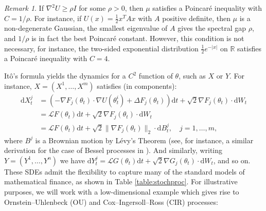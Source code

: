 \documentclass[11pt]{article}
\theoremstyle{plain}
\theoremstyle{definition}
\theoremstyle{remark}
\newtheorem{remark}[theorem]{Remark}
\numberwithin{equation}{section}
\newcommand{\R}{\mathbb{R}}
\renewcommand{\L}{\mathscr{L}}
\renewcommand{\d}{\mathrm{d}}
\newcommand{\lb}{\left}
\newcommand{\rb}{\right}
\begin{document}
\begin{remark}
If $\nabla^2 U\ge \rho I$ for some $\rho>0$, then $\mu$ satisfies a Poincar\'{e} inequality with $C= 1/\rho$. For instance, if $U(x)=\frac{1}{2}x^T Ax$ with $A$ positive definite, then $\mu$ is a non-degenerate Gaussian, the smallest eigenvalue of $A$ gives the spectral gap $\rho$, and $1/\rho$ is in fact the best Poincar\'{e} constant. However, this condition is not necessary, for instance, the two-sided exponential distribution $\frac{1}{2} e^{-|x|}$ on $\R$ satisfies a Poincar\'{e} inequality with $C=4$.
\end{remark}

It\^{o}'s formula yields the dynamics for a $C^2$ function of $\theta$, such as $X$ or $Y$. For instance, ${X=(X^1,\dots,X^m)}$ satisfies (in components):
\begin{equation}\label{eq:XSDE}
\begin{split}
\d X_t^j&=\lb(-\nabla F_j(\theta_t)\cdot \nabla U(\theta_t^i)+\Delta F_{j}(\theta_t)\rb)\d t+\sqrt{2}\nabla F_j(\theta_t) \cdot \d W_t \\
&= \L F(\theta_t) \d t+\sqrt{2}\nabla F_j(\theta_t) \cdot \d W_t\\
&=\L F(\theta_t) \d t+\sqrt{2}\|\nabla F_j(\theta_t)\|_2 \cdot \d B_t^j,\quad j=1,\dots, m,
\end{split}
\end{equation}
where $B^j$ is a Brownian motion by L\'{e}vy's Theorem (see, for instance, a similar derivation for the case of Bessel processes in \citet[Proposition 3.3.21]{karatzas_brownian_2014}).
And similarly, writing $Y=(Y^1,\dots,Y^n)$ we have $\d Y_t^j=\L G(\theta_t) \d t+\sqrt{2}\nabla G_j(\theta_t) \cdot \d W_t$, and so on. 
These SDEs admit the flexibility to capture many of the standard models of mathematical finance, as shown in Table \ref{table:stochproc}. 
For illustrative purposes, we will work with a low-dimensional example which gives rise to Ornstein--Uhlenbeck (OU) and Cox--Ingersoll--Ross (CIR) processes:
\end{document}
